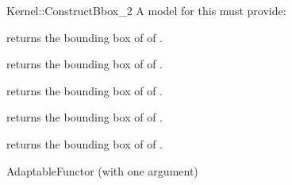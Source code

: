 \begin{ccRefFunctionObjectConcept}{Kernel::ConstructBbox_2}
A model for this must provide:



 {returns the bounding box of of .}

 {returns the bounding box of of .}

 {returns the bounding box of of .}

 {returns the bounding box of of .}

 {returns the bounding box of of .}


\ccRefines
AdaptableFunctor (with one argument)



\end{ccRefFunctionObjectConcept}
